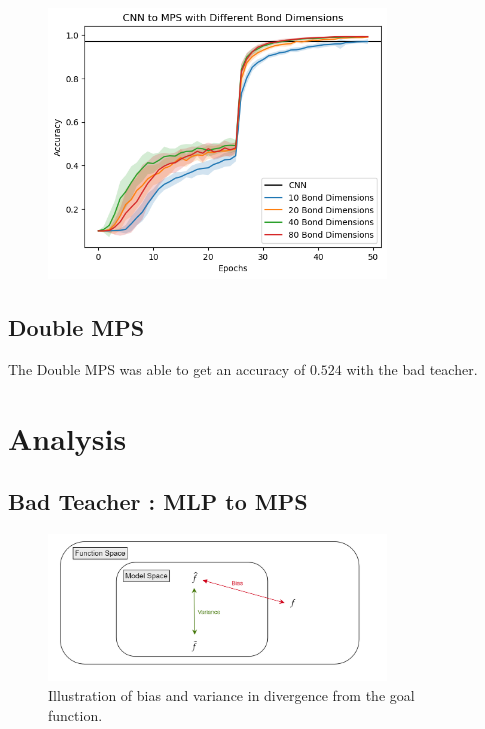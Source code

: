 \documentclass{article}
\theoremstyle{definition}
\theoremstyle{definition}
\begin{document}
\begin{figure}[H]
    \centering
    \caption{}
    \includegraphics[width=0.8\textwidth]{images/2023-04-21-18-13-15.png}
    \label{fig:CNN_to_MPS}
\end{figure}



\subsection{Double MPS}
The Double MPS was able to get an accuracy of $0.524$ with the bad teacher.

\section{Analysis}

\subsection{Bad Teacher : MLP to MPS}
\begin{figure}[hbt!]  \label{fig:function_space}
    \centering
    \caption{Illustration of bias and variance in divergence from the goal function.}
    \includegraphics[width=0.8\textwidth]{images/2023-04-21-16-47-59.png}
\end{figure}
\end{document}
